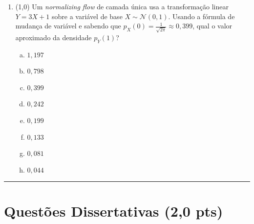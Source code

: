 \documentclass[11pt,a4paper]{article}
\begin{document}
\begin{enumerate}[1)]
\item (1{,}0) Um \textit{normalizing flow} de camada única usa a transformação linear $Y = 3X + 1$ sobre a variável de base $X \sim \mathcal{N}(0, 1)$. Usando a fórmula de mudança de variável e sabendo que $p_X(0) = \tfrac{1}{\sqrt{2\pi}} \approx 0{,}399$, qual o valor aproximado da densidade $p_Y(1)$?

\begin{enumerate}[a)]
    \item $1{,}197$
    \item $0{,}798$
    \item $0{,}399$
    \item $0{,}242$
    \item $0{,}199$
    \item $0{,}133$
    \item $0{,}081$
    \item $0{,}044$
\end{enumerate}

\end{enumerate}

\rule{\linewidth}{0.4pt}

\pagebreak
\section*{Questões Dissertativas (2{,}0 pts)}
\end{document}
